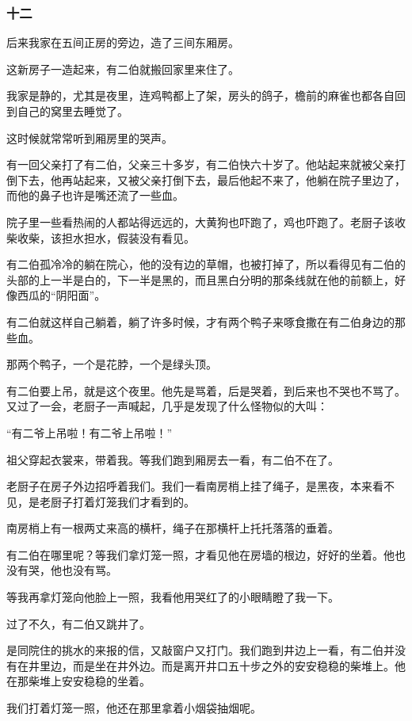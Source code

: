 \subsubsection*{十二}
\par 后来我家在五间正房的旁边，造了三间东厢房。
\par 这新房子一造起来，有二伯就搬回家里来住了。
\par 我家是静的，尤其是夜里，连鸡鸭都上了架，房头的鸽子，檐前的麻雀也都各自回到自己的窝里去睡觉了。
\par 这时候就常常听到厢房里的哭声。
\par 有一回父亲打了有二伯，父亲三十多岁，有二伯快六十岁了。他站起来就被父亲打倒下去，他再站起来，又被父亲打倒下去，最后他起不来了，他躺在院子里边了，而他的鼻子也许是嘴还流了一些血。
\par 院子里一些看热闹的人都站得远远的，大黄狗也吓跑了，鸡也吓跑了。老厨子该收柴收柴，该担水担水，假装没有看见。
\par 有二伯孤冷冷的躺在院心，他的没有边的草帽，也被打掉了，所以看得见有二伯的头部的上一半是白的，下一半是黑的，而且黑白分明的那条线就在他的前额上，好像西瓜的“阴阳面”。
\par 有二伯就这样自己躺着，躺了许多时候，才有两个鸭子来啄食撒在有二伯身边的那些血。
\par 那两个鸭子，一个是花脖，一个是绿头顶。
\par 有二伯要上吊，就是这个夜里。他先是骂着，后是哭着，到后来也不哭也不骂了。又过了一会，老厨子一声喊起，几乎是发现了什么怪物似的大叫：
\par “有二爷上吊啦！有二爷上吊啦！”
\par 祖父穿起衣裳来，带着我。等我们跑到厢房去一看，有二伯不在了。
\par 老厨子在房子外边招呼着我们。我们一看南房梢上挂了绳子，是黑夜，本来看不见，是老厨子打着灯笼我们才看到的。
\par 南房梢上有一根两丈来高的横杆，绳子在那横杆上托托落落的垂着。
\par 有二伯在哪里呢？等我们拿灯笼一照，才看见他在房墙的根边，好好的坐着。他也没有哭，他也没有骂。
\par 等我再拿灯笼向他脸上一照，我看他用哭红了的小眼睛瞪了我一下。
\par 过了不久，有二伯又跳井了。
\par 是同院住的挑水的来报的信，又敲窗户又打门。我们跑到井边上一看，有二伯并没有在井里边，而是坐在井外边。而是离开井口五十步之外的安安稳稳的柴堆上。他在那柴堆上安安稳稳的坐着。
\par 我们打着灯笼一照，他还在那里拿着小烟袋抽烟呢。

